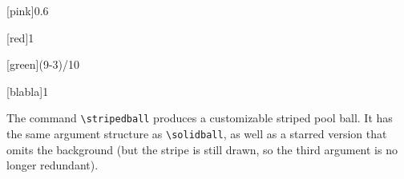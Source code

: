 \documentclass{article}
\begin{document}
{\begin{tcolorbox}[blanker,sidebyside,before skip=10pt,after skip=10pt]
\begin{verbbox}[righthand width=1.3cm]
\end{verbbox}
\begin{verbbox}[righthand width=1.3cm]
\end{verbbox}
\begin{verbbox}[righthand width=1.3cm]
[pink]{0.6}
\end{verbbox}
\begin{verbbox}[righthand width=1.3cm]
[red]{1}
\end{verbbox}
\tcblower %
\begin{verbbox}[righthand width=1.3cm]
\end{verbbox}
\begin{verbbox}[righthand width=1.3cm]
\end{verbbox}
\begin{verbbox}[righthand width=1.3cm]
[green]{(9-3)/10}
\end{verbbox}
\begin{verbbox}[righthand width=1.3cm]
[blabla]{1}
\end{verbbox}
\end{tcolorbox}

The command \verb!\stripedball! produces a customizable striped pool ball. It has the same argument structure as \verb!\solidball!, as well as a starred version that omits the background (but the stripe is still drawn, so the third argument is no longer redundant).

}
\end{document}

